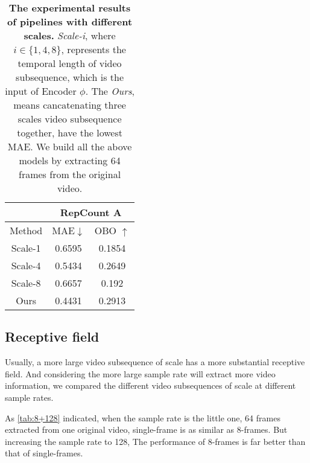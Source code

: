 \documentclass[10pt,twocolumn,letterpaper]{article}
\begin{document}
\begin{table}[ht]
\begin{center}

\begin{tabular}{c|cc}

\hline
        & \multicolumn{2}{c}{RepCount A}   \\ \hline
Method  & \multicolumn{1}{c|}{MAE$\downarrow$}    & OBO $\uparrow$    \\ \hline
Scale-1 & \multicolumn{1}{c|}{0.6595} & 0.1854 \\
Scale-4 & \multicolumn{1}{c|}{0.5434} & 0.2649 \\
Scale-8 & \multicolumn{1}{c|}{0.6657} & 0.192  \\
Ours    & \multicolumn{1}{c|}{0.4431} & 0.2913 \\ \hline
\end{tabular}
\caption{
\textbf{The experimental results of pipelines with different scales.} \textit{Scale-i}, where $i\in\{1,4,8\}$, represents the temporal length of video subsequence, which is the input of Encoder $\phi$. The \textit{Ours}, means cancatenating three scales video subsequence together, have the lowest MAE. We build all the above models by extracting 64 frames from the original video.}
\label{tab:scales}
\end{center}
\end{table}


\subsection{Receptive field}
Usually, a more large video subsequence of scale has a more substantial receptive field. And considering the more large sample rate will extract more video information, we compared the different video subsequences of scale at different sample rates. 

As \cref{tab:8+128} indicated, when the sample rate is the little one, 64 frames extracted from one original video, single-frame is as similar as 8-frames. But increasing the sample rate to 128, The performance of 8-frames is far better than that of single-frames. 
\end{document}
